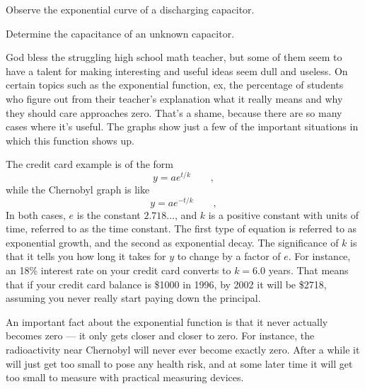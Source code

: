 \label{lab:rc}

\apparatus
{}

\begin{goals}

\item[] Observe the exponential curve of a discharging capacitor.

\item[] Determine the capacitance of an unknown capacitor.
\end{goals}

\introduction

God bless the struggling high school math teacher, but some
of them seem to have a talent for making interesting and
useful ideas seem dull and useless. On certain topics such
as the exponential function, ex, the percentage of students
who figure out from their teacher's explanation what it
really means and why they should care approaches zero.
That's a shame, because there are so many cases where it's
useful. The graphs show just a few of the important
situations in which this function shows up.


The credit card example is of the form
\begin{equation*}
    y=ae^{t/k}   \qquad   ,
\end{equation*}
while the Chernobyl graph is like
\begin{equation*}
    y=ae^{-t/k}    \qquad   ,
\end{equation*}
In both cases, $e$ is the constant $2.718\ldots$, and $k$ is a
positive constant with units of time, referred to as the
time constant. The first type of equation is referred to as
exponential growth, and the second as exponential decay. The
significance of $k$ is that it tells you how long it takes
for $y$ to change by a factor of $e$. For instance, an 18\%
interest rate on your credit card converts to $k=6.0$ years.
That means that if your credit card balance is \$1000 in
1996, by 2002 it will be \$2718, assuming you never really
start paying down the principal.

An important fact about the exponential function is that it
never actually becomes zero --- it only gets closer and
closer to zero. For instance, the radioactivity near
Chernobyl will never ever become exactly zero. After a while
it will just get too small to pose any health risk, and at
some later time it will get too small to measure with
practical measuring devices.

